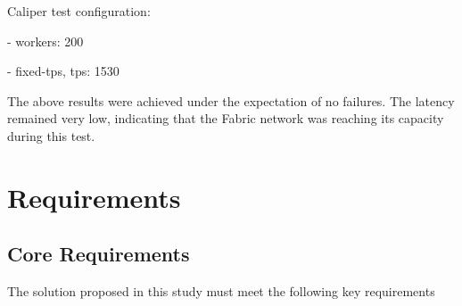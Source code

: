 \documentclass[conference]{IEEEtran}
\begin{document}
\begin{enumerate}[itemsep=2ex, parsep=1ex]
\begin{enumerate}[itemsep=2ex, parsep=1ex]
\begin{enumerate}[itemsep=2ex, parsep=1ex]
	      	      	      Caliper test configuration:
	      	      	      	      	      	      	      	      	      
	      	      	      - workers: 200
	      	      	      	      	      	      	      	      	      
	      	      	      - fixed-tps, tps: 1530
	      	      \end{enumerate}
	      \end{enumerate}
	      	      	      
	      The above results were achieved under the expectation of no failures. The
	      latency remained very low, indicating that the Fabric network was reaching
	      its capacity during this test.
\end{enumerate}

\section{Requirements}

\subsection{Core Requirements}
The solution proposed in this study must meet the following key requirements
\end{document}
